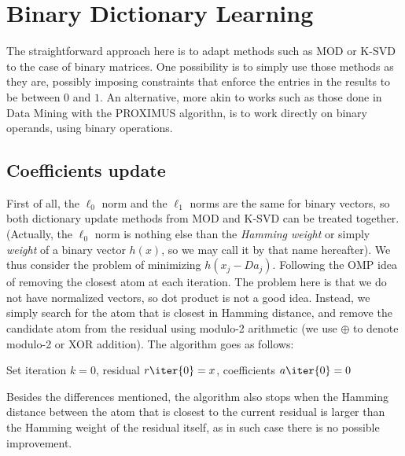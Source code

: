 \documentclass[a4paper]{IEEEtran}
\begin{document}
\section{Binary Dictionary Learning}

The straightforward approach here is to adapt methods such as MOD or K-SVD to the case of binary matrices. One possibility is to simply use those methods as they are, possibly imposing constraints that enforce the entries in the results to be between $0$ and $1$.
An alternative, more akin to works such as those done in Data Mining with the PROXIMUS algorithn, is to work directly on binary operands, using binary operations. 

\subsection{Coefficients update}

First of all, the $\ell_0$ norm and the $\ell_1$ norms are the same for binary vectors, so both dictionary update methods from MOD and K-SVD can be treated together. (Actually, the $\ell_0$ norm is nothing else than the \emph{Hamming weight} or simply \emph{weight} of a binary vector $h(x)$, so we may call it by that name hereafter). 
We thus consider the problem of minimizing $h(x_j - Da_j)$. Following the OMP idea of removing the closest atom at each iteration. The problem here is that we do not have normalized vectors, so dot product is not a good idea. 
Instead, we simply search for the atom that is closest in Hamming distance, and remove the candidate atom from the residual using modulo-2 arithmetic (we use $\oplus$ to denote modulo-2 or XOR addition). The algorithm goes as follows:

\begin{algorithm}[ht]
Set iteration $k=0$, residual $r\iter{0}=x$, coefficients $a\iter{0}=0$\;
\label{alg:bmp}
\end{algorithm}

Besides the differences mentioned, the algorithm also stops when the Hamming distance between the atom that is closest to the current residual is larger than the Hamming weight of the residual itself, as in such case there is no possible improvement.
 
\end{document}
